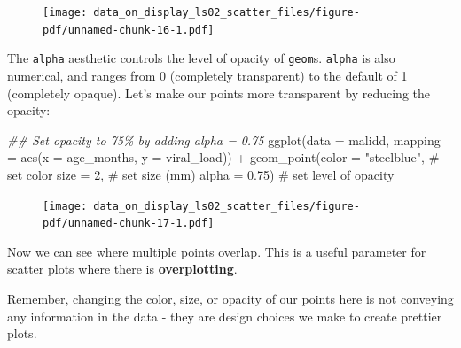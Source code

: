 \documentclass[
  letterpaper,
  DIV=11,
  numbers=noendperiod]{scrreprt}
\newenvironment{Shaded}{\begin{snugshade}}{\end{snugshade}}
\newcommand{\AttributeTok}[1]{\textcolor[rgb]{0.40,0.45,0.13}{#1}}
\newcommand{\CommentTok}[1]{\textcolor[rgb]{0.37,0.37,0.37}{#1}}
\newcommand{\DecValTok}[1]{\textcolor[rgb]{0.68,0.00,0.00}{#1}}
\newcommand{\DocumentationTok}[1]{\textcolor[rgb]{0.37,0.37,0.37}{\textit{#1}}}
\newcommand{\FloatTok}[1]{\textcolor[rgb]{0.68,0.00,0.00}{#1}}
\newcommand{\FunctionTok}[1]{\textcolor[rgb]{0.28,0.35,0.67}{#1}}
\newcommand{\NormalTok}[1]{\textcolor[rgb]{0.00,0.23,0.31}{#1}}
\newcommand{\SpecialCharTok}[1]{\textcolor[rgb]{0.37,0.37,0.37}{#1}}
\newcommand{\StringTok}[1]{\textcolor[rgb]{0.13,0.47,0.30}{#1}}
\begin{document}
\begin{figure}[H]

{\centering \texttt{[image: data\_on\_display\_ls02\_scatter\_files/figure-pdf/unnamed-chunk-16-1.pdf]}

}

\end{figure}

The \texttt{alpha} aesthetic controls the level of opacity of
\texttt{geom}s. \texttt{alpha} is also numerical, and ranges from 0
(completely transparent) to the default of 1 (completely opaque). Let's
make our points more transparent by reducing the opacity:

\begin{Shaded}
\begin{Highlighting}[]
\DocumentationTok{\#\#  Set opacity to 75\% by adding \textasciigrave{}alpha = 0.75\textasciigrave{}}
\FunctionTok{ggplot}\NormalTok{(}\AttributeTok{data =}\NormalTok{ malidd, }
       \AttributeTok{mapping =} \FunctionTok{aes}\NormalTok{(}\AttributeTok{x =}\NormalTok{ age\_months, }
                     \AttributeTok{y =}\NormalTok{ viral\_load)) }\SpecialCharTok{+} 
  \FunctionTok{geom\_point}\NormalTok{(}\AttributeTok{color =} \StringTok{"steelblue"}\NormalTok{,       }\CommentTok{\# set color}
             \AttributeTok{size =} \DecValTok{2}\NormalTok{,                  }\CommentTok{\# set size (mm)}
             \AttributeTok{alpha =} \FloatTok{0.75}\NormalTok{)              }\CommentTok{\# set level of opacity}
\end{Highlighting}
\end{Shaded}

\begin{figure}[H]

{\centering \texttt{[image: data\_on\_display\_ls02\_scatter\_files/figure-pdf/unnamed-chunk-17-1.pdf]}

}

\end{figure}

Now we can see where multiple points overlap. This is a useful parameter
for scatter plots where there is \textbf{overplotting}.

Remember, changing the color, size, or opacity of our points here is not
conveying any information in the data - they are design choices we make
to create prettier plots.
\end{document}
